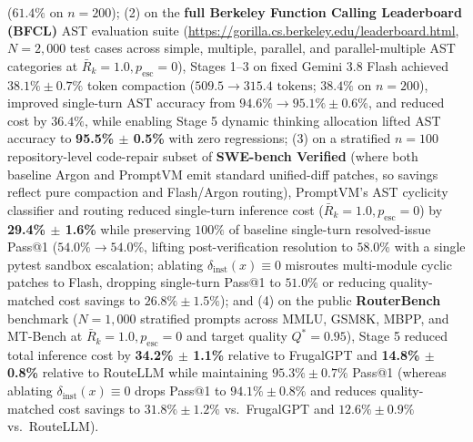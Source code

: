 \documentclass[conference,10pt]{IEEEtran}
\begin{document}
($61.4\%$ on $n=200$); (2) on the \textbf{full Berkeley Function Calling Leaderboard (BFCL)} AST evaluation suite \cite{patil2024gorilla} (\url{https://gorilla.cs.berkeley.edu/leaderboard.html}, $N = 2{,}000$ test cases across simple, multiple, parallel, and parallel-multiple AST categories at $\bar{R}_k=1.0, p_{\text{esc}}=0$), Stages 1--3 on fixed Gemini 3.8 Flash achieved $38.1\% \pm 0.7\%$ token compaction ($509.5 \to 315.4\text{ tokens}$; $38.4\%$ on $n=200$), improved single-turn AST accuracy from $94.6\% \to 95.1\% \pm 0.6\%$, and reduced cost by $36.4\%$, while enabling Stage 5 dynamic thinking allocation lifted AST accuracy to \textbf{95.5\% $\pm$ 0.5\%} with zero regressions; (3) on a stratified $n = 100$ repository-level code-repair subset of \textbf{SWE-bench Verified} (where both baseline Argon and PromptVM emit standard unified-diff patches, so savings reflect pure compaction and Flash/Argon routing), PromptVM's AST cyclicity classifier and routing reduced single-turn inference cost ($\bar{R}_k=1.0, p_{\text{esc}}=0$) by \textbf{29.4\% $\pm$ 1.6\%} while preserving $100\%$ of baseline single-turn resolved-issue Pass@1 ($54.0\% \to 54.0\%$, lifting post-verification resolution to $58.0\%$ with a single pytest sandbox escalation; ablating $\delta_{\text{inst}}(x) \equiv 0$ misroutes multi-module cyclic patches to Flash, dropping single-turn Pass@1 to $51.0\%$ or reducing quality-matched cost savings to $26.8\% \pm 1.5\%$); and (4) on the public \textbf{RouterBench} benchmark \cite{hu2024routerbench} ($N = 1{,}000$ stratified prompts across MMLU, GSM8K, MBPP, and MT-Bench at $\bar{R}_k=1.0, p_{\text{esc}}=0$ and target quality $Q^* = 0.95$), Stage 5 reduced total inference cost by \textbf{34.2\% $\pm$ 1.1\%} relative to FrugalGPT and \textbf{14.8\% $\pm$ 0.8\%} relative to RouteLLM while maintaining $95.3\% \pm 0.7\%$ Pass@1 (whereas ablating $\delta_{\text{inst}}(x) \equiv 0$ drops Pass@1 to $94.1\% \pm 0.8\%$ and reduces quality-matched cost savings to $31.8\% \pm 1.2\%$ vs.\ FrugalGPT and $12.6\% \pm 0.9\%$ vs.\ RouteLLM).
\end{document}

